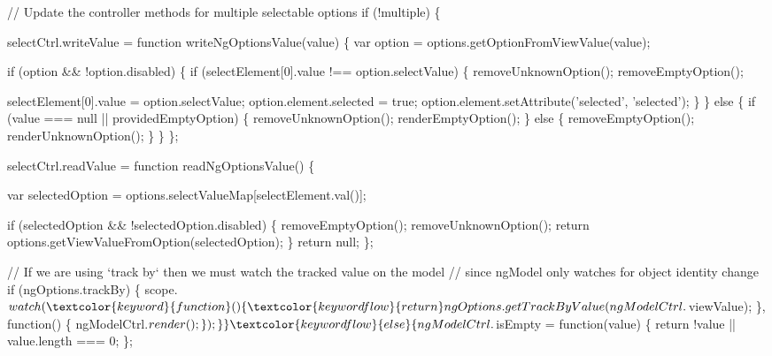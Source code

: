 \begin{DoxyCodeInclude}
{{{      \textcolor{comment}{// Update the controller methods for multiple selectable options}
      \textcolor{keywordflow}{if} (!multiple) \{

        selectCtrl.writeValue = \textcolor{keyword}{function} writeNgOptionsValue(value) \{
          var option = options.getOptionFromViewValue(value);

          \textcolor{keywordflow}{if} (option && !option.disabled) \{
            \textcolor{keywordflow}{if} (selectElement[0].value !== option.selectValue) \{
              removeUnknownOption();
              removeEmptyOption();

              selectElement[0].value = option.selectValue;
              option.element.selected = \textcolor{keyword}{true};
              option.element.setAttribute(\textcolor{stringliteral}{'selected'}, \textcolor{stringliteral}{'selected'});
            \}
          \} \textcolor{keywordflow}{else} \{
            \textcolor{keywordflow}{if} (value === null || providedEmptyOption) \{
              removeUnknownOption();
              renderEmptyOption();
            \} \textcolor{keywordflow}{else} \{
              removeEmptyOption();
              renderUnknownOption();
            \}
          \}
        \};

        selectCtrl.readValue = \textcolor{keyword}{function} readNgOptionsValue() \{

          var selectedOption = options.selectValueMap[selectElement.val()];

          \textcolor{keywordflow}{if} (selectedOption && !selectedOption.disabled) \{
            removeEmptyOption();
            removeUnknownOption();
            \textcolor{keywordflow}{return} options.getViewValueFromOption(selectedOption);
          \}
          \textcolor{keywordflow}{return} null;
        \};

        \textcolor{comment}{// If we are using `track by` then we must watch the tracked value on the model}
        \textcolor{comment}{// since ngModel only watches for object identity change}
        \textcolor{keywordflow}{if} (ngOptions.trackBy) \{
          scope.$watch(
            \textcolor{keyword}{function}() \{ \textcolor{keywordflow}{return} ngOptions.getTrackByValue(ngModelCtrl.$viewValue); \},
            \textcolor{keyword}{function}() \{ ngModelCtrl.$render(); \}
          );
        \}

      \} \textcolor{keywordflow}{else} \{

        ngModelCtrl.$isEmpty = \textcolor{keyword}{function}(value) \{
          \textcolor{keywordflow}{return} !value || value.length === 0;
        \};


}}}
\end{DoxyCodeInclude}
